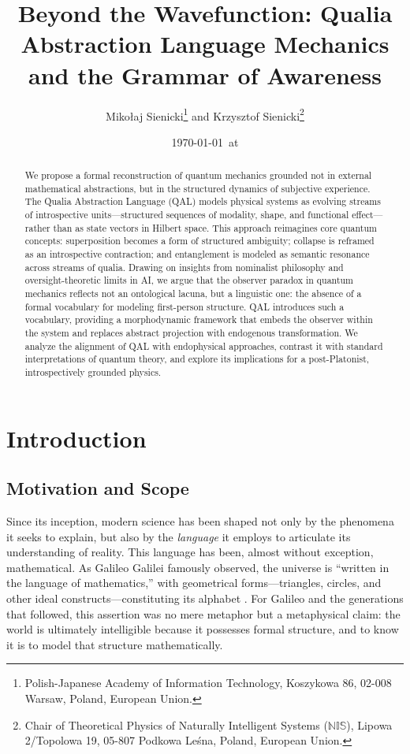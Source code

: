 \documentclass[11pt]{article}
\title{\huge\bfseries Beyond the Wavefunction: Qualia Abstraction Language Mechanics and the Grammar of Awareness}
\author{
\large Mikołaj Sienicki\thanks{Polish-Japanese Academy of Information Technology, Koszykowa 86, 02-008 Warsaw, Poland, European Union.} 
\quad and \quad
Krzysztof Sienicki\thanks{Chair of Theoretical Physics of Naturally Intelligent Systems ($\mathbb{N}\mathbb{I}\mathbb{S}$), Lipowa 2/Topolowa 19, 05-807 Podkowa Leśna, Poland, European Union.}
}
\date{\today\ at \currenttime}
\numberwithin{equation}{section} %
\begin{document}
\maketitle

\begin{abstract}
\noindent We propose a formal reconstruction of quantum mechanics grounded not in external mathematical abstractions, but in the structured dynamics of subjective experience. The Qualia Abstraction Language (QAL) models physical systems as evolving streams of introspective units—structured sequences of modality, shape, and functional effect—rather than as state vectors in Hilbert space. This approach reimagines core quantum concepts: superposition becomes a form of structured ambiguity; collapse is reframed as an introspective contraction; and entanglement is modeled as semantic resonance across streams of qualia. Drawing on insights from nominalist philosophy and oversight-theoretic limits in AI, we argue that the observer paradox in quantum mechanics reflects not an ontological lacuna, but a linguistic one: the absence of a formal vocabulary for modeling first-person structure. QAL introduces such a vocabulary, providing a morphodynamic framework that embeds the observer within the system and replaces abstract projection with endogenous transformation. We analyze the alignment of QAL with endophysical approaches, contrast it with standard interpretations of quantum theory, and explore its implications for a post-Platonist, introspectively grounded physics.
\end{abstract}

\tableofcontents
\newpage
\section{Introduction}
\subsection{Motivation and Scope}

Since its inception, modern science has been shaped not only by the phenomena it seeks to explain, but also by the \textit{language} it employs to articulate its understanding of reality. This language has been, almost without exception, mathematical. As Galileo Galilei famously observed, the universe is “written in the language of mathematics,” with geometrical forms—triangles, circles, and other ideal constructs—constituting its alphabet \cite{galileo1632}. For Galileo and the generations that followed, this assertion was no mere metaphor but a metaphysical claim: the world is ultimately intelligible because it possesses formal structure, and to know it is to model that structure mathematically.
\end{document}
